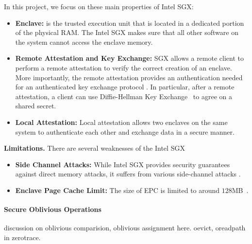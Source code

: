 In this project,  we focus on these main properties of Intel SGX:
\noindent 
\begin{itemize}
	\item \textbf{Enclave:} is the trusted execution unit that is located in a dedicated portion of the physical RAM. The Intel SGX makes sure that all other software on the system cannot access the enclave memory. 
	\item \textbf{Remote Attestation and Key Exchange:} 
	SGX allows a remote client to perform a remote attestation to verify the correct creation of an enclave. 
	More importantly, the remote attestation provides an authentication needed for an authenticated key exchange protocol \cite{sgx-explained}. 
	In particular, after a remote attestation,  a client can use Diffie-Hellman Key Exchange~\cite{DH-keyexchange} to agree on a shared secret.

	\item \textbf{Local Attestation: } Local attestation allows two enclaves on the same system to authenticate each other and exchange data in a secure manner.
\end{itemize}
\textbf{Limitations.}
There are several weaknesses of the Intel SGX
\begin{itemize}
	\item \textbf{Side Channel Attacks:} While Intel SGX provides security guarantees against direct memory attacks, it suffers from various side-channel attacks \cite{Xu15ControlledChannel,asyncshock,BrasserMDKCS17,hid-sgx-sidechannel-usenix17,shadow-branch-lee-usenix17}. 

	\item \textbf{Enclave Page Cache Limit:} The size of EPC is limited to around $128$MB~\cite{Arnautov-epc}. 
\end{itemize}

\begin{todo-text}
\paragraph{Secure Oblivious Operations} %
\label{par:secure_operations}
	discussion on oblivious comparision, oblivious assignment here. 
	oevict,  oreadpath in zerotrace.
\end{todo-text}

